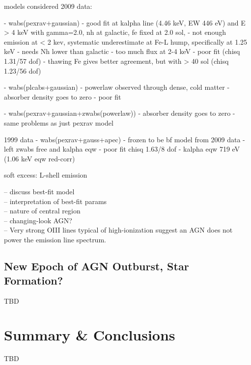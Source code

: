 \documentclass{emulateapj}
\begin{document}
models considered
2009 data:

- wabs(pexrav+gaussian)
- good fit at kalpha line (4.46 keV, EW 446 eV) and E > 4 keV with
gamma=2.0, nh at galactic, fe fixed at 2.0 sol,
- not enough emission at < 2 kev, systematic underestimate at Fe-L
hump, specifically at 1.25 keV
- needs Nh lower than galactic
- too much flux at 2-4 keV 
- poor fit (chisq 1.31/57 dof)
- thawing Fe gives better agreement, but with > 40 sol (chisq 1.23/56 dof)

- wabs(plcabs+gaussian)
- powerlaw observed through dense, cold matter
- absorber density goes to zero
- poor fit

- wabs(pexrav+gaussian+zwabs(powerlaw))
- absorber density goes to zero
- same problems as just pexrav model


1999 data
- wabs(pexrav+gauss+apec)
- frozen to be bf model from 2009 data
- left zwabs free and kalpha eqw
- poor fit chisq 1.63/8 dof
- kalpha eqw 719 eV (1.06 keV eqw red-corr)

soft excess:
L-shell emission
\citet{1990ApJ...362...90B}



-- discuss best-fit model\\
-- interpretation of best-fit params\\
-- nature of central region\\
-- changing-look AGN?\\
-- Very strong OIII lines typical of high-ionization suggest an AGN
does not power the emission line spectrum.

\subsection{New Epoch of AGN Outburst, Star Formation?}
\label{sec:centsrc}

TBD

\section{Summary \& Conclusions}
\label{sec:summary}

TBD

\acknowledgements
\end{document}

